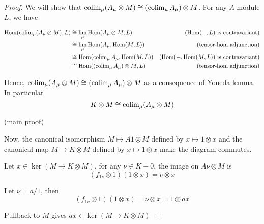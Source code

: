 \begin{proof}
	We will show that $\operatorname{colim}_\mu (A_\mu \otimes M) \cong (\operatorname{colim}_\mu A_\mu) \otimes M$. For any $A$-module $L$, we have
	
	\begin{align*}
		\operatorname{Hom}(\operatorname{colim}_\mu (A_\mu \otimes M), L)
		&\cong \lim_\mu \operatorname{Hom}(A_\mu \otimes M, L) &\text{($\operatorname{Hom}(-, L)$ is contravariant)} \\
		&\cong \lim_\mu \operatorname{Hom}(A_\mu, \operatorname{Hom}(M, L)) &\text{(tensor-hom adjunction)} \\
		&\cong \operatorname{Hom}(\operatorname{colim}_\mu A_\mu, \operatorname{Hom}(M, L)) &\text{($\operatorname{Hom}(-,  \operatorname{Hom}(M, L))$ is contravariant)} \\
		&\cong \operatorname{Hom}((\operatorname{colim}_\mu A_\mu) \otimes M, L) &\text{(tensor-hom adjunction)}
	\end{align*}
	
	Hence, $\operatorname{colim}_\mu (A_\mu \otimes M) \cong (\operatorname{colim}_\mu A_\mu) \otimes M$ as a consequence of Yoneda lemma. In particular
	$$
		K \otimes M \cong \operatorname{colim}_\mu(A_\mu \otimes M)
	$$
	
	(main proof)
	
	Now, the canonical isomorphism $M \mapsto A1 \otimes M$ defined by $x \mapsto 1 \otimes x$ and the canonical map $M \to K \otimes M$ defined by $x \mapsto 1 \otimes x$ make the diagram commutes.

	\begin{center}
	\end{center}
	
	Let $x \in \ker (M \to K \otimes M)$, for any $\nu \in K - 0$, the image on $A\nu \otimes M$ is
	$$
		(f_{1 \nu} \otimes 1) (1 \otimes x) = \nu \otimes x
	$$
	
	Let $\nu = a / 1$, then 
	$$
		(f_{1 \nu} \otimes 1) (1 \otimes x) = \nu \otimes x = 1 \otimes a x
	$$
	
	Pullback to $M$ gives $a x \in \ker (M \to K \otimes M)$	
\end{proof}


